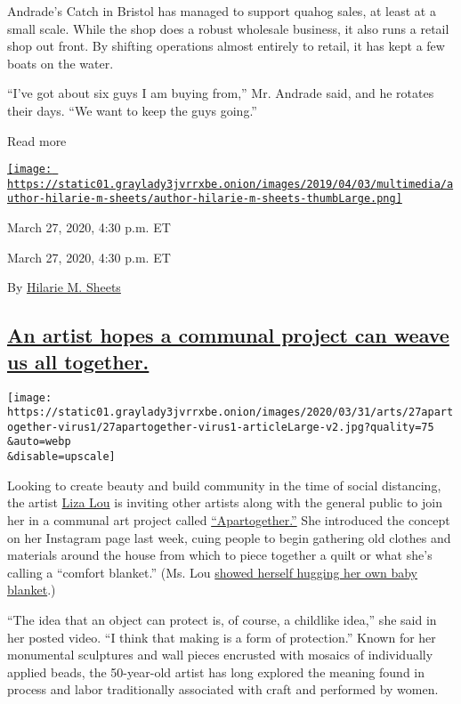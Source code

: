 Andrade's Catch in Bristol has managed to support quahog sales, at least
at a small scale. While the shop does a robust wholesale business, it
also runs a retail shop out front. By shifting operations almost
entirely to retail, it has kept a few boats on the water.

``I've got about six guys I am buying from,'' Mr. Andrade said, and he
rotates their days. ``We want to keep the guys going.''

Read more

\href{https://www.nytimes3xbfgragh.onion/by/hilarie-m-sheets}{\texttt{[image: https://static01.graylady3jvrrxbe.onion/images/2019/04/03/multimedia/author-hilarie-m-sheets/author-hilarie-m-sheets-thumbLarge.png]}}

March 27, 2020, 4:30 p.m. ET

March 27, 2020, 4:30 p.m. ET

By \href{https://www.nytimes3xbfgragh.onion/by/hilarie-m-sheets}{Hilarie
M. Sheets}

\hypertarget{an-artist-hopes-a-communal-project-can-weave-us-all-together}{%
\subsection{\texorpdfstring{\protect\hyperlink{an-artist-hopes-a-communal-project-can-weave-us-all-together}{An
artist hopes a communal project can weave us all
together.}}{An artist hopes a communal project can weave us all together.}}\label{an-artist-hopes-a-communal-project-can-weave-us-all-together}}

\texttt{[image: https://static01.graylady3jvrrxbe.onion/images/2020/03/31/arts/27apartogether-virus1/27apartogether-virus1-articleLarge-v2.jpg?quality=75\\\&auto=webp\\\&disable=upscale]}

Looking to create beauty and build community in the time of social
distancing, the artist \href{http://lizalou.com/}{Liza Lou} is inviting
other artists along with the general public to join her in a communal
art project called
\href{http://www.apartogether.com/}{``Apartogether.''} She introduced
the concept on her Instagram page last week, cuing people to begin
gathering old clothes and materials around the house from which to piece
together a quilt or what she's calling a ``comfort blanket.'' (Ms. Lou
\href{https://www.instagram.com/p/B969GxWFGqu/}{showed herself hugging
her own baby blanket}.)

``The idea that an object can protect is, of course, a childlike idea,''
she said in her posted video. ``I think that making is a form of
protection.'' Known for her monumental sculptures and wall pieces
encrusted with mosaics of individually applied beads, the 50-year-old
artist has long explored the meaning found in process and labor
traditionally associated with craft and performed by women.

